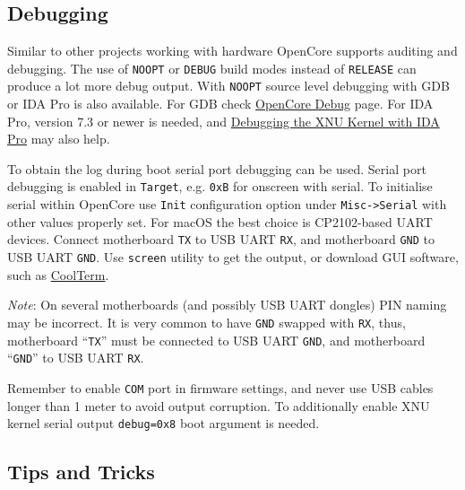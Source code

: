 \documentclass[]{article}
\begin{document}
\subsection{Debugging}\label{troubleshootingdebug}

Similar to other projects working with hardware OpenCore supports auditing and debugging.
The use of \texttt{NOOPT} or \texttt{DEBUG} build modes instead of \texttt{RELEASE}
can produce a lot more debug output. With \texttt{NOOPT} source level debugging with
GDB or IDA Pro is also available. For GDB check
\href{https://github.com/acidanthera/OpenCorePkg/tree/master/Debug}{OpenCore Debug}
page. For IDA Pro, version 7.3 or newer is needed, and
\href{https://www.hex-rays.com/products/ida/support/tutorials/index.shtml}{Debugging the XNU Kernel with IDA Pro}
may also help.

To obtain the log during boot serial port debugging can be used. Serial port
debugging is enabled in \texttt{Target}, e.g. \texttt{0xB} for onscreen with serial. To
initialise serial within OpenCore use \texttt{Init} configuration option under \texttt{Misc->Serial} with other values properly set.
For macOS the best choice is CP2102-based UART devices. Connect motherboard \texttt{TX}
to USB UART \texttt{RX}, and motherboard \texttt{GND} to USB UART \texttt{GND}. Use
\texttt{screen} utility to get the output, or download GUI software, such as
\href{https://freeware.the-meiers.org}{CoolTerm}.

\emph{Note}: On several motherboards (and possibly USB UART dongles) PIN naming may be
incorrect. It is very common to have \texttt{GND} swapped with \texttt{RX}, thus,
motherboard ``\texttt{TX}'' must be connected to USB UART \texttt{GND}, and motherboard ``\texttt{GND}''
to USB UART \texttt{RX}.

Remember to enable \texttt{COM} port in firmware settings, and never use USB cables longer
than 1 meter to avoid output corruption. To additionally enable XNU kernel serial output
\texttt{debug=0x8} boot argument is needed.

\subsection{Tips and Tricks}\label{troubleshootingtricks}
\end{document}
